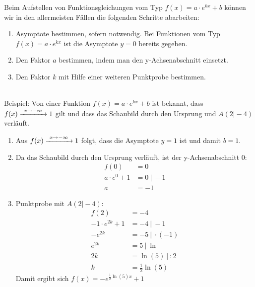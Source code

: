 Beim Aufstellen von Funktionsgleichungen vom Typ \(f(x)=a\cdot e^{kx}+b\) können wir in den allermeisten Fällen die folgenden Schritte abarbeiten:
\begin{enumerate}[label=\arabic*)]
	\item Asymptote bestimmen, sofern notwendig. Bei Funktionen vom Typ \(f(x)=a\cdot e^{kx}\) ist die Asymptote \(y=0\) bereits gegeben.
	\item Den Faktor \(a\) bestimmen, indem man den y-Achsenabschnitt einsetzt.
	\item Den Faktor \(k\) mit Hilfe einer weiteren Punktprobe bestimmen.
\end{enumerate}
\hphantom{x}\\
Beispiel: Von einer Funktion \(f(x)=a\cdot e^{kx}+b\) ist bekannt, dass \(f(x)\xrightarrow{\hphantom{\ }x\to-\infty\hphantom{\ }}1\) gilt und dass das Schaubild durch den Ursprung und \(A(2\vert-4)\) verläuft.
\textcolor{loes}{
	\begin{enumerate}[label=\arabic*)]
		\item Aus \(f(x)\xrightarrow{\hphantom{\ }x\to-\infty\hphantom{\ }}1\) folgt, dass die Asymptote \(y=1\) ist und damit \(b=1\).
		\item Da das Schaubild durch den Ursprung verläuft, ist der y-Achsenabschnitt 0:
		\begin{align*}
			f(0)&=0\\
			a\cdot e^0+1&=0\ \vert\ -1\\
			a&=-1
		\end{align*}
		\item Punktprobe mit \(A(2\vert-4)\):
		\begin{align*}
			f(2)&=-4\\
			-1\cdot e^{2k}+1&=-4\ \vert\ -1\\
			-e^{2k}&=-5\ \vert\ \cdot(-1)\\
			e^{2k}&=5\ \vert\ \ln\\
			2k&=\ln\left(5\right)\ \vert\ :2\\
			k&=\frac{1}{2}\ln\left(5\right)
		\end{align*}
		Damit ergibt sich \(f(x)=-e^{\frac{1}{2}\ln\left(5\right)x}+1\)
\end{enumerate}}
\newpage
